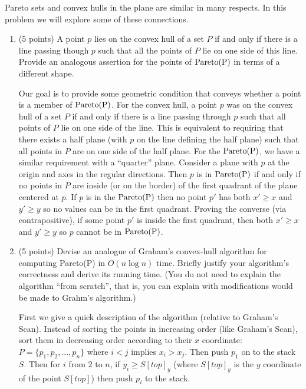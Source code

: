 \documentclass[11pt]{article}
\newcommand{\pareto}[1]{\rm{Pareto}(#1)}
\begin{document}
Pareto sets and convex hulls in the plane are similar in many respects.  In
this problem we will explore some of these connections.

\begin{enumerate}

\item (5 points) A point $p$ lies on the convex hull of a set $P$ if and only if there is
a line passing though $p$ such that all the points of $P$ lie on one side of
this line.  Provide an analogous assertion for the points of $\pareto{P}$ in
terms of a different shape.

\answer
Our goal is to provide some geometric condition that conveys whether a point is a member of $\pareto{P}$.
For the convex hull, a point $p$ was on the convex hull of a set $P$ if and only if there is a line passing through $p$ such that all points of $P$ lie on one side of the line.
This is equivalent to requiring that there exists a half plane (with $p$ on the line defining the half plane) such that all points in $P$ are on one side of the half plane.
For the $\pareto{P}$, we have a similar requirement with a ``quarter'' plane.
Consider a plane with $p$ at the origin and axes in the regular directions.
Then $p$ is in $\pareto{P}$ if and only if no points in $P$ are inside (or on the border) of the first quadrant of the plane centered at $p$.
If $p$ is in the $\pareto{P}$ then no point $p'$ has both $x' \geq x$ and $y' \geq y$ so no values can be in the first quadrant.
Proving the converse (via contrapositive), if some point $p'$ is inside the first quadrant, then both $x' \geq x$ and $y' \geq y$ so $p$ cannot be in $\pareto{P}$.

\item (5 points) Devise an analogue of Graham's convex-hull algorithm for computing
\pareto{P} in $O(n \log n)$ time.  Briefly justify your algorithm's correctness
and derive its running time.  (You do not need to explain the algorithm ``from
scratch'', that is, you can explain with modifications would be made to Grahm's
algorithm.)

\answer
First we give a quick description of the algorithm (relative to Graham's Scan).
Instead of sorting the points in increasing order (like Graham's Scan), sort them in decreasing order according to their $x$ coordinate: $P = \{ p_1, p_2, ..., p_n \}$ where $i < j$ implies $x_i > x_j$.
Then push $p_1$ on to the stack $S$.
Then for $i$ from $2$ to $n$, if $y_i \geq S[top]_y$ (where $S[top]_y$ is the $y$ coordinate of the point $S[top]$) then push $p_i$ to the stack.


\end{enumerate}
\end{document}
